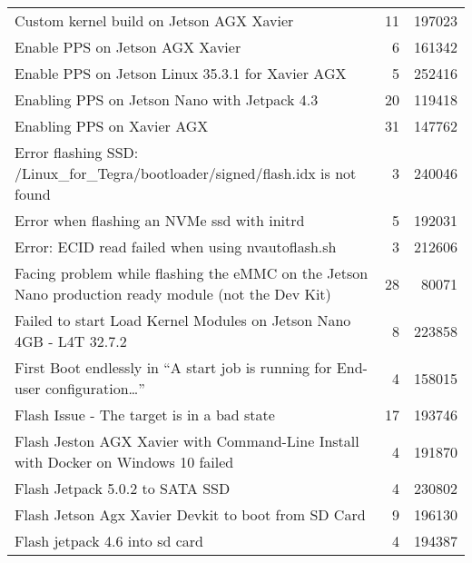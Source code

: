\begin{longtable}{p{}rr}
    Custom kernel build on Jetson AGX Xavier                                                            & 11      & 197023 \\
    Enable PPS on Jetson AGX Xavier                                                                     & 6       & 161342 \\
    Enable PPS on Jetson Linux 35.3.1 for Xavier AGX                                                    & 5       & 252416 \\
    Enabling PPS on Jetson Nano with Jetpack 4.3                                                        & 20      & 119418 \\
    Enabling PPS on Xavier AGX                                                                          & 31      & 147762 \\
    Error flashing SSD: /Linux\_for\_Tegra/bootloader/signed/flash.idx is not found                     & 3       & 240046 \\
    Error when flashing an NVMe ssd with initrd                                                         & 5       & 192031 \\
    Error: ECID read failed when using nvautoflash.sh                                                   & 3       & 212606 \\
    Facing problem while flashing the eMMC on the Jetson Nano production ready module (not the Dev Kit) & 28      & 80071  \\
    Failed to start Load Kernel Modules on Jetson Nano 4GB - L4T 32.7.2                                 & 8       & 223858 \\
    First Boot endlessly in “A start job is running for End-user configuration…”                        & 4       & 158015 \\
    Flash Issue - The target is in a bad state                                                          & 17      & 193746 \\
    Flash Jeston AGX Xavier with Command-Line Install with Docker on Windows 10 failed                  & 4       & 191870 \\
    Flash Jetpack 5.0.2 to SATA SSD                                                                     & 4       & 230802 \\
    Flash Jetson Agx Xavier Devkit to boot from SD Card                                                 & 9       & 196130 \\
    Flash jetpack 4.6 into sd card                                                                      & 4       & 194387 \\

\end{longtable}
